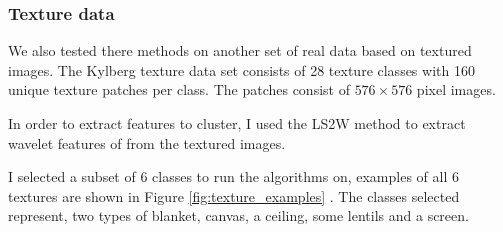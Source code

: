 \subsubsection{Texture data}

We also tested there methods on another set of real data based on textured images. The Kylberg \citep{kylberg2011c} texture data set consists of 28 texture classes with 160 unique texture patches per class. The patches consist of $576 \times 576$ pixel images.

In order to extract features to cluster, I used the LS2W \citep{Eckley2011} method to extract wavelet features of from the textured images.

I selected a subset of 6 classes to run the algorithms on, examples of all 6 textures are shown in Figure \ref{fig:texture_examples} .  The classes selected represent, two types of blanket, canvas, a ceiling, some lentils and a screen.


